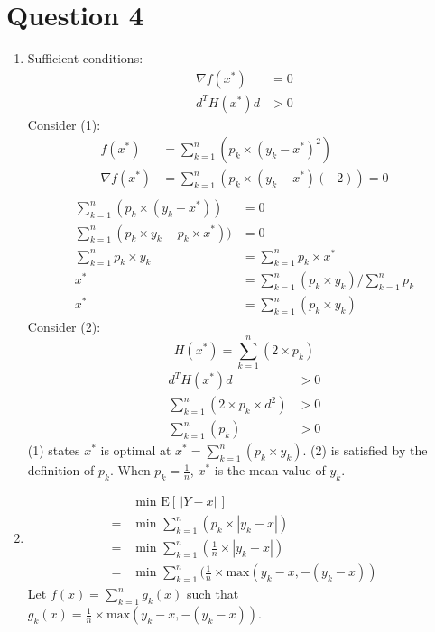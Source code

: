 \documentclass[10pt,a4paper]{article}
\begin{document}
\section*{Question 4}
\begin{enumerate}
	\item
	Sufficient conditions:
	\begin{align}
		\nabla f(x^*) &= 0 \\
		d^TH(x^*)d &> 0
	\end{align}
	Consider (1):
	\begin{align*}
		f(x^*) &= \sum_{k=1}^{n}(p_k \times (y_k - x^*)^2) \\
		\nabla f(x^*) &= \sum_{k=1}^{n}(p_k \times (y_k - x^*)(-2)) = 0 \\
	\end{align*}
	\begin{align*}
		\sum_{k=1}^{n}(p_k \times (y_k - x^*)) &= 0 \\
		\sum_{k=1}^{n}(p_k \times y_k - p_k \times x^*)) &= 0 \\
		\sum_{k=1}^{n}p_k \times y_k &= \sum_{k=1}^{n}p_k \times x^* \\
		x^* &= \sum_{k=1}^{n}(p_k \times y_k) / \sum_{k=1}^{n} p_k \\
		x^* &= \sum_{k=1}^{n}(p_k \times y_k)
	\end{align*}
	Consider (2):
	\begin{equation*}
	H(x^*) = \sum_{k=1}^{n}(2 \times p_k)
	\end{equation*}
	\begin{align*}
		d^TH(x^*)d &> 0 \\
		\sum_{k=1}^{n}(2 \times p_k \times d^2) &> 0 \\
		\sum_{k=1}^{n}(p_k) &> 0
	\end{align*}
	(1) states \(x^*\) is optimal at \(x^* = \sum_{k=1}^{n}(p_k \times y_k)\). (2) is satisfied by the definition of \(p_k\). When \(p_k = \frac{1}{n}\), \(x^*\) is the mean value of \(y_k\).
	\item 
	\begin{align*}
	&\text{ min E}[ \, | Y - x| \, ] \\
	= &\text{ min } \sum_{k=1}^{n} ( p_k \times | y_k - x | ) \\
	= &\text{ min } \sum_{k=1}^{n} ( \frac{1}{n} \times | y_k - x | ) \\
	= &\text{ min } \sum_{k=1}^{n} ( \frac{1}{n} \times \text{max}(y_k - x, -(y_k - x) )
	\end{align*}
	Let \(f(x) = \sum_{k=1}^{n} g_k(x)\) such that \(g_k(x) = \frac{1}{n} \times \text{max}(y_k - x, -(y_k - x)) \). \\ \\

\end{enumerate}
\end{document}
